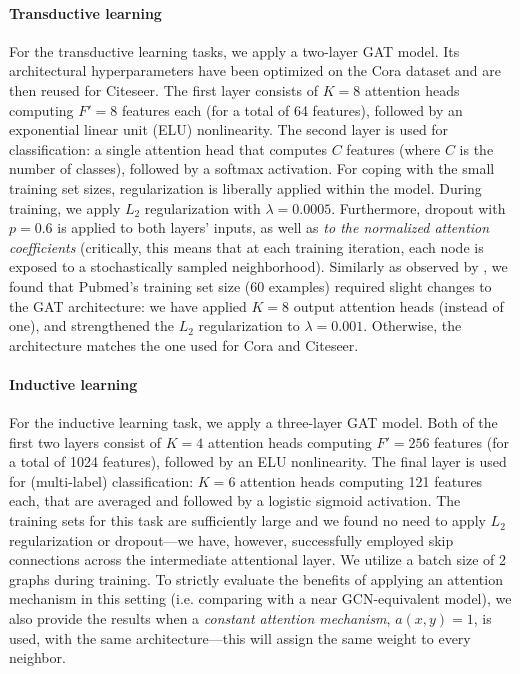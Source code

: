 \documentclass{article} %
\begin{document}
\paragraph{Transductive learning} 
For the transductive learning tasks, we apply a two-layer GAT model. Its architectural hyperparameters have been optimized on the Cora dataset and are then reused for Citeseer. The first layer consists of $K=8$ attention heads computing $F'=8$ features each (for a total of 64 features), followed by an exponential linear unit (ELU) \citep{clevert2015fast} nonlinearity. The second layer is used for classification: a single attention head that computes $C$ features (where $C$ is the number of classes), followed by a softmax activation. For coping with the small training set sizes, regularization is liberally applied within the model. During training, we apply $L_2$ regularization with $\lambda = 0.0005$. Furthermore, dropout \citep{srivastava2014dropout} with $p=0.6$ is applied to both layers' inputs, as well as \emph{to the normalized attention coefficients} (critically, this means that at each training iteration, each node is exposed to a stochastically sampled neighborhood). Similarly as observed by \cite{monti2016geometric}, we found that Pubmed's training set size (60 examples) required slight changes to the GAT architecture: we have applied $K=8$ output attention heads (instead of one), and strengthened the $L_2$ regularization to $\lambda=0.001$. Otherwise, the architecture matches the one used for Cora and Citeseer.

\paragraph{Inductive learning} 
For the inductive learning task, we apply a three-layer GAT model. Both of the first two layers consist of $K=4$ attention heads computing $F'=256$ features (for a total of 1024 features), followed by an ELU nonlinearity. The final layer is used for (multi-label) classification: $K=6$ attention heads computing 121 features each, that are averaged and followed by a logistic sigmoid activation. The training sets for this task are sufficiently large and we found no need to apply $L_2$ regularization or dropout---we have, however, successfully employed skip connections \citep{he2016deep} across the intermediate attentional layer. We utilize a batch size of 2 graphs during training. To strictly evaluate the benefits of applying an attention mechanism in this setting (i.e. comparing with a near GCN-equivalent model), we also provide the results when a \emph{constant attention mechanism}, $a(x, y) = 1$, is used, with the same architecture---this will assign the same weight to every neighbor.
\end{document}
